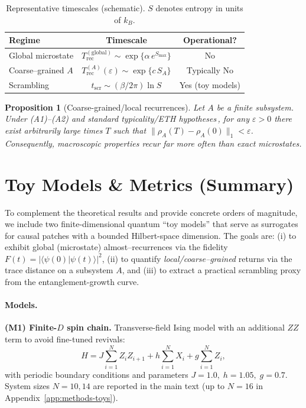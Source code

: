 \documentclass[12pt]{article}
\newcommand{\Smax}{S_{\max}}
\newcommand{\TrecA}{T^{(A)}_{\text{rec}}}
\newcommand{\tscr}{t_{\text{scr}}}
\newtheorem{proposition}{Proposition}
\theoremstyle{remark}
\begin{document}
\begin{table}[t]
\centering
\caption{Representative timescales (schematic). $S$ denotes entropy in units of $k_B$.}
\begin{tabular}{lcc}
\toprule
Regime & Timescale & Operational? \\
\midrule
Global microstate & $\displaystyle T^{\mathrm{(global)}}_{\text{rec}}\sim \exp\{\alpha\,e^{\Smax}\}$ & No \\
Coarse–grained $A$ & $\displaystyle \TrecA(\varepsilon)\sim \exp\{c\,S_A\}$ & Typically No \\
Scrambling & $\displaystyle \tscr\sim (\beta/2\pi)\ln S$ & Yes (toy models) \\
\bottomrule
\end{tabular}
\label{tab:times}
\end{table}


\begin{proposition}[Coarse-grained/local recurrences]\label{prop:coarse}
Let $A$ be a finite subsystem. Under (A1)--(A2) and standard typicality/ETH hypotheses\,\cite{GoldsteinEtAl2006,Deutsch1991}, for any $\varepsilon>0$ there exist arbitrarily large times $T$ such that $\lVert\rho_A(T)-\rho_A(0)\rVert_1<\varepsilon$. Consequently, macroscopic properties recur far more often than exact microstates.
\end{proposition}


\section{Toy Models \& Metrics (Summary)}
\label{sec:toymodels}

To complement the theoretical results and provide concrete orders of magnitude, we include two finite-dimensional quantum “toy models” that serve as surrogates for causal patches with a bounded Hilbert-space dimension. The goals are: (i) to exhibit global (microstate) almost–recurrences via the fidelity
\(
F(t)=|\langle\psi(0)|\psi(t)\rangle|^2
\),
(ii) to quantify \emph{local/coarse–grained} returns via the trace distance on a subsystem \(A\),
and (iii) to extract a practical scrambling proxy from the entanglement-growth curve.

\paragraph{Models.}
\textbf{(M1) Finite-$D$ spin chain.}
Transverse-field Ising model with an additional \(ZZ\) term to avoid fine-tuned revivals:
\[
H = J\sum_{i=1}^{N} Z_i Z_{i+1} + h\sum_{i=1}^{N} X_i + g\sum_{i=1}^{N} Z_i,
\]
with periodic boundary conditions and parameters \(J=1.0,\; h=1.05,\; g=0.7\).
System sizes \(N=10,14\) are reported in the main text (up to \(N=16\) in Appendix~\ref{app:methods-toys}).
\end{document}
